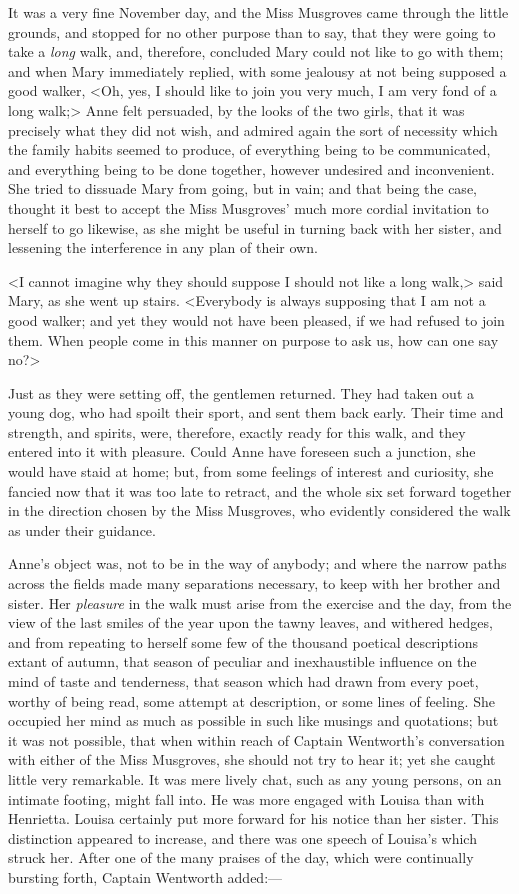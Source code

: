 It was a very fine November day, and the Miss Musgroves came through the little grounds, and stopped for no other purpose than to say, that they were going to take a \textit{long} walk, and, therefore, concluded Mary could not like to go with them; and when Mary immediately replied, with some jealousy at not being supposed a good walker, <Oh, yes, I should like to join you very much, I am very fond of a long walk;> Anne felt persuaded, by the looks of the two girls, that it was precisely what they did not wish, and admired again the sort of necessity which the family habits seemed to produce, of everything being to be communicated, and everything being to be done together, however undesired and inconvenient. She tried to dissuade Mary from going, but in vain; and that being the case, thought it best to accept the Miss Musgroves' much more cordial invitation to herself to go likewise, as she might be useful in turning back with her sister, and lessening the interference in any plan of their own.

<I cannot imagine why they should suppose I should not like a long walk,> said Mary, as she went up stairs. <Everybody is always supposing that I am not a good walker; and yet they would not have been pleased, if we had refused to join them. When people come in this manner on purpose to ask us, how can one say no?>

Just as they were setting off, the gentlemen returned. They had taken out a young dog, who had spoilt their sport, and sent them back early. Their time and strength, and spirits, were, therefore, exactly ready for this walk, and they entered into it with pleasure. Could Anne have foreseen such a junction, she would have staid at home; but, from some feelings of interest and curiosity, she fancied now that it was too late to retract, and the whole six set forward together in the direction chosen by the Miss Musgroves, who evidently considered the walk as under their guidance.

Anne's object was, not to be in the way of anybody; and where the narrow paths across the fields made many separations necessary, to keep with her brother and sister. Her \textit{pleasure} in the walk must arise from the exercise and the day, from the view of the last smiles of the year upon the tawny leaves, and withered hedges, and from repeating to herself some few of the thousand poetical descriptions extant of autumn, that season of peculiar and inexhaustible influence on the mind of taste and tenderness, that season which had drawn from every poet, worthy of being read, some attempt at description, or some lines of feeling. She occupied her mind as much as possible in such like musings and quotations; but it was not possible, that when within reach of Captain Wentworth's conversation with either of the Miss Musgroves, she should not try to hear it; yet she caught little very remarkable. It was mere lively chat, such as any young persons, on an intimate footing, might fall into. He was more engaged with Louisa than with Henrietta. Louisa certainly put more forward for his notice than her sister. This distinction appeared to increase, and there was one speech of Louisa's which struck her. After one of the many praises of the day, which were continually bursting forth, Captain Wentworth added:—

